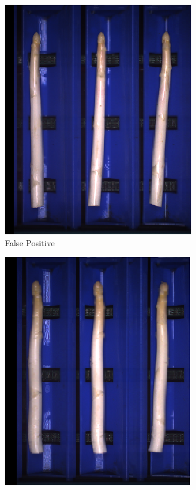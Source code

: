 \begin{figure}[!htb]
	\begin{subfigure}{0.3\textwidth}
		\includegraphics[width=0.9\linewidth]{Figures/appendix/violet_falsepositive_01.png}
		\vspace{-5pt}
		\caption{False Positive}
	\end{subfigure}
	\begin{subfigure}{0.3\textwidth}
		\includegraphics[width=0.9\linewidth]{Figures/appendix/violet_falsepositive_02.png}

\end{subfigure}
\end{figure}
